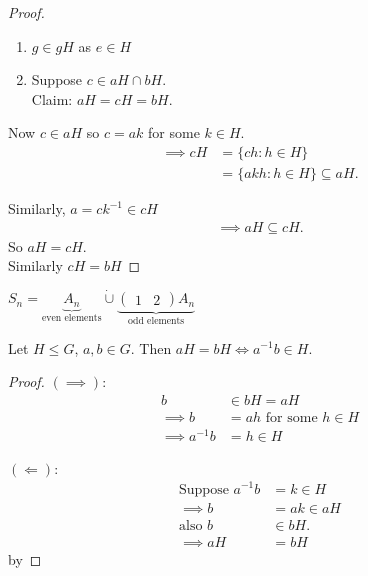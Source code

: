 \begin{proof} ~
    \begin{enumerate}
    \def\labelenumi{\roman{enumi}.}
        \item
        $g \in gH$ as $e \in H$
        \item
        Suppose $c \in aH \cap bH$.\\
        Claim: $aH = cH = bH$.
    \end{enumerate}

    Now $c \in aH$ so $c = ak$ for some $k \in H$.
    \begin{align*}
        \implies cH &= \{ c h : h \in H \} \\
        &= \{ a k h : h \in H \} \subseteq aH.
    \end{align*}

    Similarly, $a = c k^{-1} \in cH$
    \begin{align*}
        \implies aH \subseteq cH.
    \end{align*}
    So $aH = cH$.\\
    Similarly $cH = bH$
\end{proof}

\begin{example}
$S_n = \underbrace{A_n}_\text{even elements} \mathbin{\dot{\cup}} \underbrace{\begin{pmatrix}1 & 2\end{pmatrix} A_n}_\text{odd elements}$
\end{example}

\begin{lemma}
\protect\hypertarget{lem:eleven}{}\label{lem:eleven}
Let $H \leq G$, $a, b \in G$.
Then $aH = bH \iff a^{-1} b \in H$.
\end{lemma}

\begin{proof}
$(\implies)$:
\begin{align*}
    b &\in bH = aH \\
    \implies b &= ah \text{ for some } h \in H \\
    \implies a^{-1} b &= h \in H
\end{align*}

$(\Longleftarrow)$:
\begin{align*}
    \text{Suppose } a^{-1}b &= k \in H \\
    \implies b &= ak \in aH \\
    \text{also } b &\in bH. \\
    \implies aH &= bH
\end{align*} by 
\end{proof}

